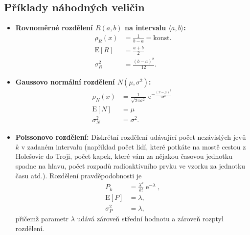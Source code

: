 \documentclass[a4paper,11pt,twoside]{article}
\DeclareMathOperator{\e}{e}             %
\def\expectation#1{\mathrm{E}\left[#1\right]}
\def\dispersion#1{\sigma_{#1}^{2}}
\theoremstyle{red}
\theoremstyle{green}
\begin{document}
    \subsection{Příklady náhodných veličin}
        \begin{itemize}
            \item {\bf Rovnoměrné rozdělení $R(a,b)$ na intervalu $\langle a,b\rangle$:}
                \begin{align}
                    \label{eq:UniformDistribution}
                    \rho_{R}(x)&=\frac{1}{b-a}=\text{konst.}\\
                    \label{eq:ExpectationR}
                    \expectation{R}&=\frac{a+b}{2}\\
                    \label{eq:DispersionR}
                    \dispersion{R}&=\frac{(b-a)^{2}}{12}.
                \end{align} 

            \item {\bf Gaussovo normální rozdělení $N\left(\mu,\sigma^{2}\right)$:}
                \begin{align}
                    \label{eq:NormalDistribution}
                    \rho_{N}(x)&=\frac{1}{\sqrt{2\pi\sigma^{2}}}\e^{-\frac{(x-\mu)^{2}}{2\sigma^{2}}}\\
                    \expectation{N}&=\mu\\
                    \dispersion{N}&=\sigma^{2}.
                \end{align} 

            \item {\bf Poissonovo rozdělení:}
                Diskrétní rozdělení udávající počet nezávislých jevů $k$ v zadaném intervalu (například počet lidí, které potkáte na mostě cestou z Holešovic do Troji, počet kapek, které vám za nějakou časovou jednotku spadne na hlavu, počet rozpadů radioaktivního prvku ve vzorku za jednotku času atd.).  
                Rozdělení pravděpodobnosti je
                \begin{align}
                    \label{eq:Poisson}
                    P_{k}&=\frac{\lambda^{k}}{k!}\e^{-\lambda},\\
                    \label{eq:ExpectationP}
                    \expectation{P}&=\lambda,\\
                    \label{eq:DispersionP}
                    \dispersion{P}&=\lambda,
                \end{align}
                přičemž parametr $\lambda$ udává zároveň střední hodnotu a zároveň rozptyl rozdělení.
        \end{itemize}
\end{document}
